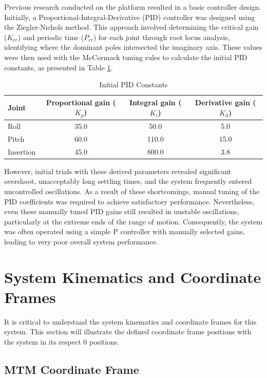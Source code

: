 Previous research conducted on the platform resulted in a basic controller design. Initially, a Proportional-Integral-Derivative (PID) controller was designed using the Ziegler-Nichols method. This approach involved determining the critical gain ($K_{cr}$) and periodic time ($P_{cr}$) for each joint through root locus analysis, identifying where the dominant poles intersected the imaginary axis. These values were then used with the McCormack tuning rules to calculate the initial PID constants, as presented in Table \ref{tab:pid_constants}.

\begin{table}[h!]
    \centering
    \caption{Initial PID Constants}
    \label{tab:pid_constants}
    \begin{tabular}{lccc}
        \toprule
        \textbf{Joint} & \textbf{Proportional gain ($K_p$)} & \textbf{Integral gain ($K_i$)} & \textbf{Derivative gain ($K_d$)} \\
        \midrule
        Roll & 35.0 & 50.0 & 5.0 \\
        Pitch & 60.0 & 110.0 & 15.0 \\
        Insertion & 45.0 & 800.0 & 3.8 \\
        \bottomrule
    \end{tabular}
\end{table}

However, initial trials with these derived parameters revealed significant overshoot, unacceptably long settling times, and the system frequently entered uncontrolled oscillations. As a result of these shortcomings, manual tuning of the PID coefficients was required to achieve satisfactory performance. Nevertheless, even these manually tuned PID gains still resulted in unstable oscillations, particularly at the extreme ends of the range of motion. Consequently, the system was often operated using a simple P controller with manually selected gains, leading to very poor overall system performance.


\section{System Kinematics and Coordinate Frames}

It is critical to understand the system kinematics and coordinate frames for this system. This section will illustrate the defined coordinate frame positions with the system in its respect 0 positions. 

\subsection{MTM Coordinate Frame}

